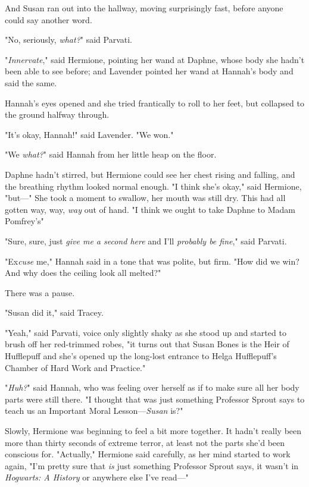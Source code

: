 And Susan ran out into the hallway, moving surprisingly fast, before anyone
could say another word.

"No, seriously, \emph{what?}" said Parvati.

"\emph{Innervate}," said Hermione, pointing her wand at Daphne, whose body she
hadn't been able to see before; and Lavender pointed her wand at Hannah's body
and said the same.

Hannah's eyes opened and she tried frantically to roll to her feet, but
collapsed to the ground halfway through.

"It's okay, Hannah!" said Lavender. "We won."

"We \emph{what?}" said Hannah from her little heap on the floor.

Daphne hadn't stirred, but Hermione could see her chest rising and falling, and
the breathing rhythm looked normal enough. "I think she's okay," said Hermione,
"but\mbox{---}" She took a moment to swallow, her mouth was still dry. This had all
gotten way, way, \emph{way} out of hand. "I think we ought to take Daphne to
Madam Pomfrey's{\el}"

"Sure, sure, just \emph{give me a second here} and I'll \emph{probably be
fine}," said Parvati.

"Ex\emph{cuse} me," Hannah said in a tone that was polite, but firm. "How did
we win? And why does the ceiling look all melted?"

There was a pause.

"Susan did it," said Tracey.

"Yeah," said Parvati, voice only slightly shaky as she stood up and started to
brush off her red-trimmed robes, "it turns out that Susan Bones is the Heir of
Hufflepuff and she's opened up the long-lost entrance to Helga Hufflepuff's
Chamber of Hard Work and Practice."

"\emph{Huh?}" said Hannah, who was feeling over herself as if to make sure all
her body parts were still there. "I thought that was just something Professor
Sprout says to teach us an Important Moral Lesson---\emph{Susan} is?"

Slowly, Hermione was beginning to feel a bit more together. It hadn't really
been more than thirty seconds of extreme terror, at least not the parts she'd
been conscious for. "Actually," Hermione said carefully, as her mind started to
work again, "I'm pretty sure that \emph{is} just something Professor Sprout
says, it wasn't in \emph{Hogwarts: A History} or anywhere else I've read\mbox{---}"

